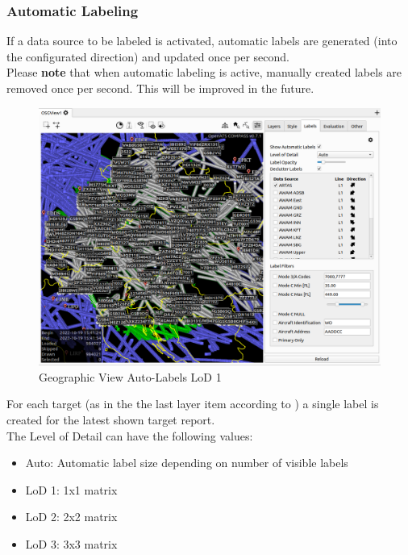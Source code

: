 \subsubsection{Automatic Labeling}

If a data source to be labeled is activated, automatic labels are generated (into the configurated direction) and updated once per second. \\

Please \textbf{note} that when automatic labeling is active, manually created labels are removed once per second. This will be improved in the future.

\begin{figure}[H]
    \hspace*{-2.5cm}
    \includegraphics[width=19cm,frame]{figures/geoview_label_lod1.png}
  \caption{Geographic View Auto-Labels LoD 1}
\end{figure}

For each target (as in the the last layer item according to ) a single label is created for the latest shown target report. \\

The Level of Detail can have the following values:
\begin{itemize}
 \item Auto: Automatic label size depending on number of visible labels
 \item LoD 1: 1x1 matrix
 \item LoD 2: 2x2 matrix
 \item LoD 3: 3x3 matrix
\end{itemize} 
\ \\

